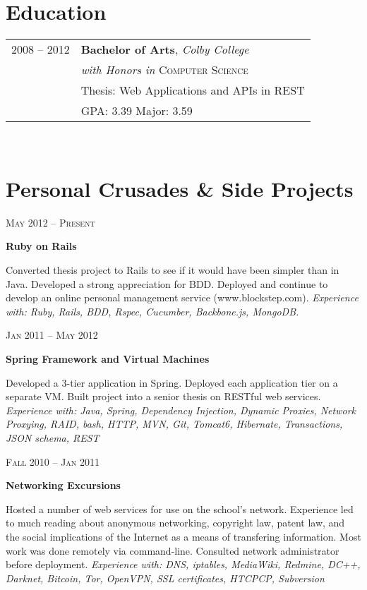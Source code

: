 \documentclass[10pt]{article} %
\begin{document}
{\begin{minipage}[t]{0.44\textwidth}
\section{Education}

\begin{tabular}{rl} %

2008 -- \textsc{2012} & \textbf{Bachelor of Arts}, \textit{Colby College}\\ 
											& \textit{with Honors in} \textsc{Computer Science} \\
											& \footnotesize Thesis: Web Applications and APIs in REST \\
											& \small{GPA: 3.39} \small{Major: 3.59} \\
\end{tabular}\\

\section{Personal Crusades \& Side Projects}


{\raggedleft\textsc{May 2012 -- Present}\par}
{\raggedright\large \textbf{Ruby on Rails}}
{\normalsize{ Converted thesis project to Rails to see if it would have been simpler than in Java. Developed a strong appreciation for BDD. Deployed and continue to develop an online personal management service (www.blockstep.com).}
\textit{Experience with: Ruby, Rails, BDD, Rspec, Cucumber, Backbone.js, MongoDB. }}


{\raggedleft\textsc{Jan 2011 -- May 2012}\par}
{\raggedright\large \textbf{Spring Framework and Virtual Machines} }
{\normalsize{ Developed a 3-tier application in Spring. Deployed each application tier on a separate VM. Built project into a senior thesis on RESTful web services. }
\textit{Experience with: Java, Spring, Dependency Injection, Dynamic Proxies, Network Proxying, RAID, bash, HTTP, MVN, Git, Tomcat6, Hibernate, Transactions, JSON schema, REST } }

{\raggedleft\textsc{Fall 2010 -- Jan 2011}\par}
{\raggedright\large \textbf{Networking Excursions} }
{\normalsize{Hosted a number of web services for use on the school's network. Experience led to much reading about anonymous networking, copyright law, patent law, and the social implications of the Internet as a means of transfering information. Most work was done remotely via command-line. Consulted network administrator before deployment. }
\textit{Experience with: DNS, iptables, MediaWiki, Redmine, DC++, Darknet, Bitcoin, Tor, OpenVPN, SSL certificates, HTCPCP, Subversion}}\\



\end{minipage}}
\end{document}
